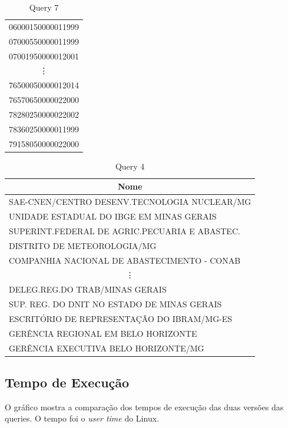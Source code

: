 \documentclass{article}
\begin{document}
\begin{table}[H]
\begin{minipage}{.3\linewidth}
\begin{tabular}{c}
      06000150000011999 \\
      07000550000011999 \\
      07001950000012001 \\
      \vdots \\
      76500050000012014 \\
      76570650000022000 \\
      78280250000022002 \\
      78360250000011999 \\
      79158050000022000 \\
      \bottomrule
    \end{tabular}
    \caption*{Query 7}
  \end{minipage}
\end{table}

\begin{table}[H]
  \centering
  \begin{tabular}{l}
    \multicolumn{1}{c}{Nome} \\
    \midrule
    SAE-CNEN/CENTRO DESENV.TECNOLOGIA NUCLEAR/MG \\
    UNIDADE ESTADUAL DO IBGE EM MINAS GERAIS \\
    SUPERINT.FEDERAL DE AGRIC.PECUARIA E ABASTEC. \\
    DISTRITO DE METEOROLOGIA/MG \\
    COMPANHIA NACIONAL DE ABASTECIMENTO - CONAB \\
    \multicolumn{1}{c}{\vdots} \\
    DELEG.REG.DO TRAB/MINAS GERAIS \\
    SUP. REG. DO DNIT NO ESTADO DE MINAS GERAIS \\
    ESCRITÓRIO DE REPRESENTAÇÃO DO IBRAM/MG-ES \\
    GERÊNCIA REGIONAL EM BELO HORIZONTE \\
    GERÊNCIA EXECUTIVA BELO HORIZONTE/MG \\
    \bottomrule
  \end{tabular}
  \caption*{Query 4}
\end{table}

\pagebreak

\subsection{Tempo de Execução}
O gráfico mostra a comparação dos tempos de execução das duas versões das queries.
O tempo foi o \textit{user time} do Linux.
\begin{figure}[H]
  \begin{center}  
        
  \end{center}  
  \label{fig:graph}
\end{figure}
\end{document}
